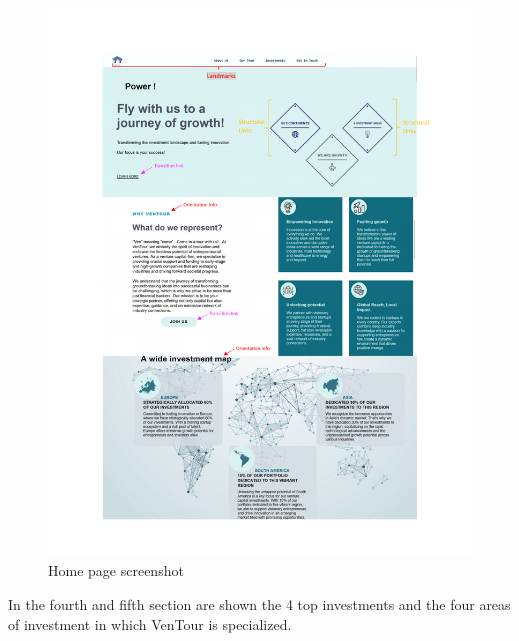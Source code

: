 \documentclass[../../DD.tex]{subfiles}
\begin{document}
	\begin{figure}[!htb]
	    \centering
	    \includegraphics[width=\textwidth]{Images/screenshots/Home Page.pdf}
	    \caption{Home page screenshot}
	    \label{fig: Home_Page_screenshot}
	\end{figure}
    In the fourth and fifth section are shown the 4 top investments and the four areas of investment in which VenTour is specialized.
\end{document}
